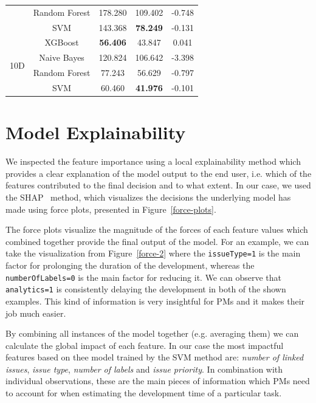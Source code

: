 \documentclass[conference,compsoc]{IEEEtran}
\begin{document}
\begin{table}[!t]
\begin{tabular}{c|c|c|c|c}
		&Random Forest& 178.280 & 109.402 & -0.748 \\
		& SVM & 143.368 & \textbf{78.249} & -0.131 \\
		\hline
		\multirow{4}{*}{10D}
		&XGBoost& \textbf{56.406} & 43.847 & 0.041 \\
		&Naive Bayes& 120.824 & 106.642 & -3.398 \\
		&Random Forest& 77.243 & 56.629 & -0.797 \\
		& SVM & 60.460 & \textbf{41.976} & -0.101 \\
	\end{tabular}
\end{table}

\section{Model Explainability}
We inspected the feature importance using a local explainability method which provides a clear explanation of the model output to the end user, i.e. which of the features contributed to the final decision and to what extent. In our case, we used the SHAP~\cite{lundberg2020local2global} method, which visualizes the decisions the underlying model has made using force plots, presented in Figure~\ref{force-plots}.

The force plots visualize the magnitude of the forces of each feature values which combined together provide the final output of the model. For an example, we can take the visualization from Figure~\ref{force-2} where the \texttt{issueType=1} is the main factor for prolonging the duration of the development, whereas the \texttt{numberOfLabels=0} is the main factor for reducing it. We can observe that \texttt{analytics=1} is consistently delaying the development in both of the shown examples. This kind of information is very insightful for PMs and it makes their job much easier.

By combining all instances of the model together (e.g. averaging them) we can calculate the global impact of each feature. In our case the most impactful features based on thee model trained by the SVM method are: \textit{number of linked issues}, \textit{issue type}, \textit{number of labels} and \textit{issue priority}. In combination with individual observations, these are the main pieces of information which PMs need to account for when estimating the development time of a particular task.
\end{document}
